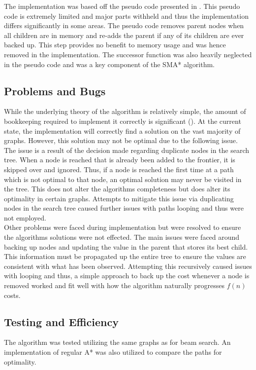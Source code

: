 \documentclass[]{article}
\begin{document}
The implementation was based off the pseudo code presented in \cite{russell_paper}. This pseudo code is extremely limited and major parts withheld and thus the implementation differs significantly in some areas. The pseudo code removes parent nodes when all children are in memory and re-adds the parent if any of its children are ever backed up. This step provides no benefit to memory usage and was hence removed in the implementation. The successor function was also heavily neglected in the pseudo code and was a key component of the SMA* algorithm.

\subsection*{Problems and Bugs}

While the underlying theory of the algorithm is relatively simple, the amount of bookkeeping required to implement it correctly is significant (\cite{norvig}). At the current state, the implementation will correctly find a solution on the vast majority of graphs. However, this solution may not be optimal due to the following issue. \\

The issue is a result of the decision made regarding duplicate nodes in the search tree. When a node is reached that is already been added to the frontier, it is skipped over and ignored. Thus, if a node is reached the first time at a path which is not optimal to that node, an optimal solution may never be visited in the tree. This does not alter the algorithms completeness but does alter its optimality in certain graphs. Attempts to mitigate this issue via duplicating nodes in the search tree caused further issues with paths looping and thus were not employed.\\

Other problems were faced during implementation but were resolved to ensure the algorithms solutions were not effected. The main issues were faced around backing up nodes and updating the value in the parent that stores its best child. This information must be propagated up the entire tree to ensure the values are consistent with what has been observed. Attempting this recursively caused issues with looping and thus, a simple approach to back up the cost whenever a node is removed worked and fit well with how the algorithm naturally progresses $f(n)$ costs.

\subsection*{Testing and Efficiency}

The algorithm was tested utilizing the same graphs as for beam search. An implementation of regular A* was also utilized to compare the paths for optimality.


\break
\setlength{}
\printbibliography[title={References}]

\end{document}
